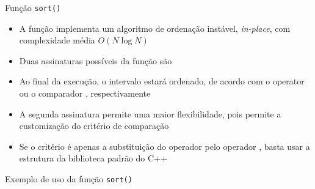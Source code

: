\begin{frame}[fragile]{Função \texttt{sort()}}

    \begin{itemize}
        \item A função  implementa um algoritmo de ordenação instável,
            \textit{in-place}, com complexidade média $O(N\log N)$

        \item Duas assinaturas possíveis da função  são

        \item Ao final da execução, o intervalo \code{c++}{[first, last)} estará ordenado, de
            acordo com o operator  ou o comparador , respectivamente

        \item A segunda assinatura permite uma maior flexibilidade, pois permite a customização
            do critério de comparação

        \item Se o critério é apenas a substituição do operador  pelo operador
            , basta usar a estrutura  da biblioteca padrão
            do C++

    \end{itemize}

\end{frame}

\begin{frame}[fragile]{Exemplo de uso da função \texttt{sort()}}
\end{frame}

